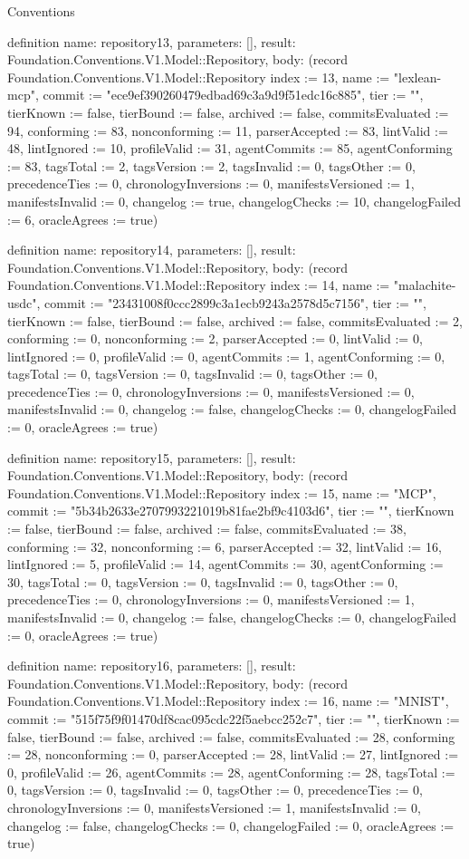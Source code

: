 \begin{lexlean}{Conventions}
\begin{semanticmodule}
definition{
  name: repository13,
  parameters: [],
  result: Foundation.Conventions.V1.Model::Repository,
  body: (record Foundation.Conventions.V1.Model::Repository {index := 13, name := "lexlean-mcp", commit := "ece9ef390260479edbad69c3a9d9f51edc16c885", tier := "", tierKnown := false, tierBound := false, archived := false, commitsEvaluated := 94, conforming := 83, nonconforming := 11, parserAccepted := 83, lintValid := 48, lintIgnored := 10, profileValid := 31, agentCommits := 85, agentConforming := 83, tagsTotal := 2, tagsVersion := 2, tagsInvalid := 0, tagsOther := 0, precedenceTies := 0, chronologyInversions := 0, manifestsVersioned := 1, manifestsInvalid := 0, changelog := true, changelogChecks := 10, changelogFailed := 6, oracleAgrees := true})
}

definition{
  name: repository14,
  parameters: [],
  result: Foundation.Conventions.V1.Model::Repository,
  body: (record Foundation.Conventions.V1.Model::Repository {index := 14, name := "malachite-usdc", commit := "23431008f0ccc2899c3a1ecb9243a2578d5c7156", tier := "", tierKnown := false, tierBound := false, archived := false, commitsEvaluated := 2, conforming := 0, nonconforming := 2, parserAccepted := 0, lintValid := 0, lintIgnored := 0, profileValid := 0, agentCommits := 1, agentConforming := 0, tagsTotal := 0, tagsVersion := 0, tagsInvalid := 0, tagsOther := 0, precedenceTies := 0, chronologyInversions := 0, manifestsVersioned := 0, manifestsInvalid := 0, changelog := false, changelogChecks := 0, changelogFailed := 0, oracleAgrees := true})
}

definition{
  name: repository15,
  parameters: [],
  result: Foundation.Conventions.V1.Model::Repository,
  body: (record Foundation.Conventions.V1.Model::Repository {index := 15, name := "MCP", commit := "5b34b2633e2707993221019b81fae2bf9c4103d6", tier := "", tierKnown := false, tierBound := false, archived := false, commitsEvaluated := 38, conforming := 32, nonconforming := 6, parserAccepted := 32, lintValid := 16, lintIgnored := 5, profileValid := 14, agentCommits := 30, agentConforming := 30, tagsTotal := 0, tagsVersion := 0, tagsInvalid := 0, tagsOther := 0, precedenceTies := 0, chronologyInversions := 0, manifestsVersioned := 1, manifestsInvalid := 0, changelog := false, changelogChecks := 0, changelogFailed := 0, oracleAgrees := true})
}

definition{
  name: repository16,
  parameters: [],
  result: Foundation.Conventions.V1.Model::Repository,
  body: (record Foundation.Conventions.V1.Model::Repository {index := 16, name := "MNIST", commit := "515f75f9f01470df8cac095cdc22f5aebcc252c7", tier := "", tierKnown := false, tierBound := false, archived := false, commitsEvaluated := 28, conforming := 28, nonconforming := 0, parserAccepted := 28, lintValid := 27, lintIgnored := 0, profileValid := 26, agentCommits := 28, agentConforming := 28, tagsTotal := 0, tagsVersion := 0, tagsInvalid := 0, tagsOther := 0, precedenceTies := 0, chronologyInversions := 0, manifestsVersioned := 1, manifestsInvalid := 0, changelog := false, changelogChecks := 0, changelogFailed := 0, oracleAgrees := true})
}


\end{semanticmodule}
\end{lexlean}
